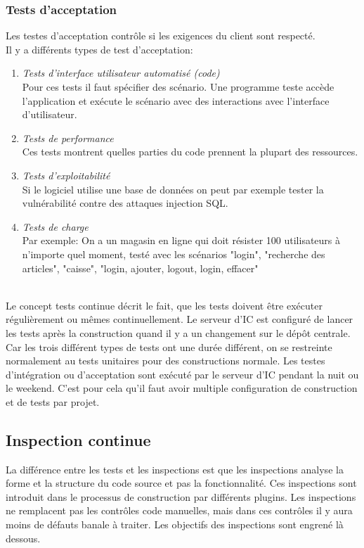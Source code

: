 \subsubsection{Tests d'acceptation}
Les testes d'acceptation contrôle si les exigences du client sont respecté. \\
Il y a différents types de test d'acceptation:
\begin{enumerate}
 \item \textit{Tests d'interface utilisateur automatisé (code)}
 \\Pour ces tests il faut spécifier des scénario. Une programme teste accède l'application et exécute le scénario avec des interactions avec l'interface d'utilisateur.
 \item \textit{Tests de performance}
 \\Ces tests montrent quelles parties du code prennent la plupart des ressources.
 \item \textit{Tests d'exploitabilité}
 \\Si le logiciel utilise une base de données on peut par exemple tester la vulnérabilité contre des attaques injection SQL.
 \item \textit{Tests de charge}
 \\Par exemple: On a un magasin en ligne qui doit résister 100 utilisateurs à n'importe quel moment, testé avec les scénarios "login", "recherche des articles", "caisse", "login, ajouter, logout, login, effacer"
\end{enumerate}
\ \\
Le concept tests continue décrit le fait, que les tests doivent être exécuter régulièrement ou mêmes continuellement. Le serveur d'IC est configuré de lancer les tests après la construction quand il y a un changement sur le dépôt centrale. Car les trois différent types de tests ont une durée différent, on se restreinte normalement au tests unitaires pour des constructions normale. Les testes d'intégration ou d'acceptation sont exécuté par le serveur d'IC pendant la nuit ou le weekend. C'est pour cela qu'il faut avoir multiple configuration de construction et de tests par projet.
\newpage

\subsection{Inspection continue}

La différence entre les tests et les inspections est que les inspections analyse la forme et la structure du code source et pas la fonctionnalité. Ces inspections sont introduit dans le processus de construction par différents plugins. Les inspections ne remplacent pas les contrôles code manuelles, mais dans ces contrôles il y aura moins de défauts banale à traiter. Les objectifs des inspections sont engrené là dessous.

